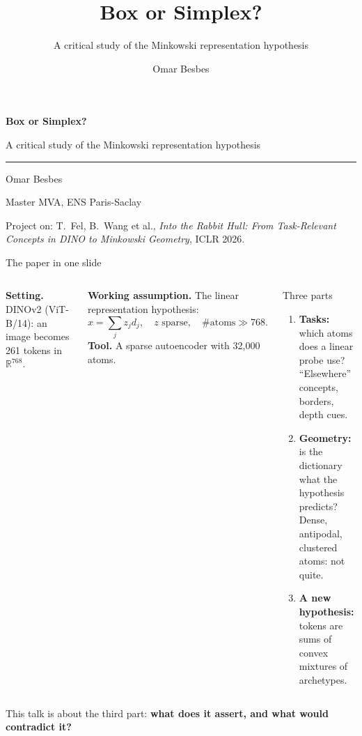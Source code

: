 \documentclass[aspectratio=169,10pt]{beamer}
\title{Box or Simplex?}
\subtitle{A critical study of the Minkowski representation hypothesis}
\author{Omar Besbes}
\institute{Master MVA, ENS Paris-Saclay}
\date{}
\newcommand{\R}{\mathbb{R}}
\newcommand{\src}[1]{{\color{rhgray}\footnotesize #1}}
\newcommand{\key}[1]{\textbf{\color{rhblue}#1}}
\begin{document}
\begin{frame}[plain]
  \vspace{2.2em}
  {\Huge\bfseries Box or Simplex?}\par\vspace{0.5em}
  {\Large A critical study of the Minkowski representation hypothesis}\par\vspace{0.3em}
  {\color{rhblue}\rule{3em}{1.5pt}}\par\vspace{1.3em}
  {\large Omar Besbes}\par
  {\color{ink2}Master MVA, ENS Paris-Saclay}\par\vspace{2.2em}
  \src{Project on: T.~Fel, B.~Wang et al., \emph{Into the Rabbit Hull: From Task-Relevant Concepts in DINO to Minkowski
  Geometry}, ICLR 2026.}
\end{frame}

\begin{frame}{The paper in one slide}
  \begin{columns}[T,onlytextwidth]
    \textbf{Setting.} DINOv2 (ViT-B/14): an image becomes 261 tokens in $\R^{768}$.\par\medskip
    \textbf{Working assumption.} The linear representation hypothesis:
    \[ x=\sum_{j} z_j d_j,\quad z \text{ sparse},\quad \#\text{atoms}\gg 768 . \]
    \textbf{Tool.} A sparse autoencoder with 32,000 atoms.
    \begin{block}{Three parts}
      \begin{enumerate}
        \item \textbf{Tasks:} which atoms does a linear probe use?\\
        {\color{ink2}``Elsewhere'' concepts, borders, depth cues.}
        \item \textbf{Geometry:} is the dictionary what the hypothesis predicts?\\
        {\color{ink2}Dense, antipodal, clustered atoms: not quite.}
        \item \textbf{A new hypothesis:} tokens are sums of convex mixtures of archetypes.
      \end{enumerate}
    \end{block}
  \end{columns}
  \vfill
  \centering This talk is about the third part: \key{what does it assert, and what would contradict it?}
\end{frame}
\end{document}

